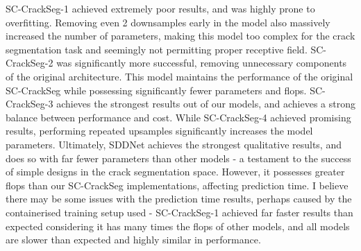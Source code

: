 \documentclass[a4paper,12pt]{report}
\begin{document}
SC-CrackSeg-1 achieved extremely poor results, and was highly prone to overfitting. Removing even 2 downsamples early in the model also massively increased the number of parameters, making this model too complex for the crack segmentation task and seemingly not permitting proper receptive field. SC-CrackSeg-2 was significantly more successful, removing unnecessary components of the original architecture. This model maintains the performance of the original SC-CrackSeg while possessing significantly fewer parameters and flops. SC-CrackSeg-3 achieves the strongest results out of our models, and achieves a strong balance between performance and cost. While SC-CrackSeg-4 achieved promising results, performing repeated upsamples significantly increases the model parameters. Ultimately, SDDNet achieves the strongest qualitative results, and does so with far fewer parameters than other models - a testament to the success of simple designs in the crack segmentation space. However, it possesses greater flops than our SC-CrackSeg implementations, affecting prediction time. I believe there may be some issues with the prediction time results, perhaps caused by the containerised training setup used - SC-CrackSeg-1 achieved far faster results than expected considering it has many times the flops of other models, and all models are slower than expected and highly similar in performance.
\end{document}
